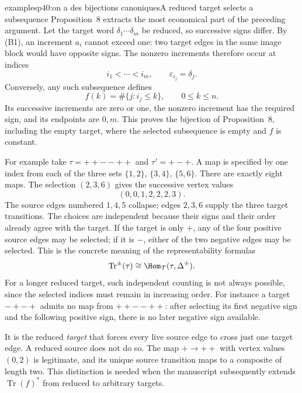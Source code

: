 \begin{dcomment}{examples}{p40:on a des bijections canoniques}{A reduced target selects a subsequence}
Proposition~8 extracts the most economical part of the preceding argument. Let the target word $\delta_1\cdots\delta_m$ be reduced, so successive signs differ. By (B1), an increment $a_i$ cannot exceed one: two target edges in the same image block would have opposite signs. The nonzero increments therefore occur at indices
\[
 i_1<\cdots<i_m,\qquad \varepsilon_{i_j}=\delta_j.
\]
Conversely, any such subsequence defines
\[
 f(k)=\#\{j:i_j\leq k\},\qquad 0\leq k\leq n.
\]
Its successive increments are zero or one, the nonzero increment has the required sign, and its endpoints are $0,m$. This proves the bijection of Proposition~8, including the empty target, where the selected subsequence is empty and $f$ is constant.

For example take $\tau=++--++$ and $\tau'=+-+$. A map is specified by one index from each of the three sets
$\{1,2\}$, $\{3,4\}$, $\{5,6\}$. There are exactly eight maps. The selection $(2,3,6)$ gives the successive vertex values
\[
 (0,0,1,2,2,2,3).
\]
The source edges numbered $1,4,5$ collapse; edges $2,3,6$ supply the three target transitions. The choices are independent because their signs and their order already agree with the target. If the target is only $+$, any of the four positive source edges may be selected; if it is $-$, either of the two negative edges may be selected. This is the concrete meaning of the representability formulas
\[
 \operatorname{Tr}^{\pm}(\tau)
 \cong\Hom_{\mathcal T}(\tau,\Delta^{\pm}).
\]
For a longer reduced target, such independent counting is not always possible, since the selected indices must remain in increasing order. For instance a target $-+-+$ admits no map from $++--++$: after selecting its first negative sign and the following positive sign, there is no later negative sign available.

It is the reduced \emph{target} that forces every live source edge to cross just one target edge. A reduced source does not do so. The map $+\to++$ with vertex values $(0,2)$ is legitimate, and its unique source transition maps to a composite of length two. This distinction is needed when the manuscript subsequently extends $\operatorname{Tr}(f)^*$ from reduced to arbitrary targets.
\end{dcomment}

